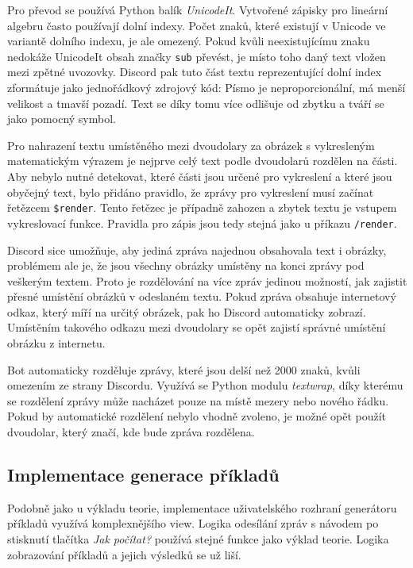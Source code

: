 \documentclass[FM]{tulthesis}
\begin{document}
	Pro převod se používá Python balík \textit{UnicodeIt}. Vytvořené zápisky pro lineární algebru často používají dolní indexy. Počet znaků, které existují v Unicode ve variantě dolního indexu, je ale omezený. Pokud kvůli neexistujícímu znaku nedokáže UnicodeIt obsah značky \verb|sub| převést, je místo toho daný text vložen mezi zpětné uvozovky. Discord pak tuto část textu reprezentující dolní index zformátuje jako jednořádkový zdrojový kód: Písmo je neproporcionální, má menší velikost a tmavší pozadí. Text se díky tomu více odlišuje od zbytku a tváří se jako pomocný symbol.
	
	Pro nahrazení textu umístěného mezi dvoudolary za obrázek s vykresleným matematickým výrazem je nejprve celý text podle dvoudolarů rozdělen na části. Aby nebylo nutné detekovat, které části jsou určené pro vykreslení a které jsou obyčejný text, bylo přidáno pravidlo, že zprávy pro vykreslení musí začínat řetězcem \verb|$render|. Tento řetězec je případně zahozen a zbytek textu je vstupem vykreslovací funkce. Pravidla pro zápis jsou tedy stejná jako u příkazu \verb|/render|.
	
	Discord sice umožňuje, aby jediná zpráva najednou obsahovala text i obrázky, problémem ale je, že jsou všechny obrázky umístěny na konci zprávy pod veškerým textem. Proto je rozdělování na více zpráv jedinou možností, jak zajistit přesné umístění obrázků v odeslaném textu. Pokud zpráva obsahuje internetový odkaz, který míří na určitý obrázek, pak ho Discord automaticky zobrazí. Umístěním takového odkazu mezi dvoudolary se opět zajistí správné umístění obrázku z internetu.
	
	Bot automaticky rozděluje zprávy, které jsou delší než 2000 znaků, kvůli omezením ze strany Discordu. Využívá se Python modulu \textit{textwrap}, díky kterému se rozdělení zprávy může nacházet pouze na místě mezery nebo nového řádku. Pokud by automatické rozdělení nebylo vhodně zvoleno, je možné opět použít dvoudolar, který značí, kde bude zpráva rozdělena.
	
	\subsection{Implementace generace příkladů}
	
	Podobně jako u výkladu teorie, implementace uživatelského rozhraní generátoru příkladů využívá komplexnějšího view. Logika odesílání zpráv s návodem po stisknutí tlačítka \textit{Jak počítat?} používá stejné funkce jako výklad teorie. Logika zobrazování příkladů a jejich výsledků se už liší.
	
\end{document}
